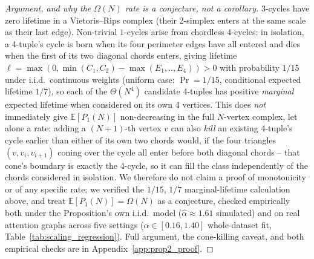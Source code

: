 \documentclass{article}
\begin{document}
\begin{proof}[Argument, and why the $\Omega(N)$ rate is a conjecture, not a corollary]
3-cycles have zero lifetime in a Vietoris--Rips complex (their 2-simplex enters at the same scale as their last edge). Non-trivial $1$-cycles arise from chordless $4$-cycles: in isolation, a 4-tuple's cycle is born when its four perimeter edges have all entered and dies when the first of its two diagonal chords enters, giving lifetime $\ell = \max(0, \min(C_1,C_2) - \max(E_1,..,E_4)) > 0$ with probability $1/15$ under i.i.d.\ continuous weights (uniform case: $\Pr = 1/15$, conditional expected lifetime $1/7$), so each of the $\Theta(N^4)$ candidate 4-tuples has positive \emph{marginal} expected lifetime when considered on its own 4 vertices. This does \emph{not} immediately give $\mathbb{E}[P_1(N)]$ non-decreasing in the full $N$-vertex complex, let alone a rate: adding a $(N{+}1)$-th vertex $v$ can also \emph{kill} an existing 4-tuple's cycle earlier than either of its own two chords would, if the four triangles $(v,v_i,v_{i+1})$ coning over the cycle all enter before both diagonal chords -- that cone's boundary is exactly the 4-cycle, so it can fill the class independently of the chords considered in isolation. We therefore do not claim a proof of monotonicity or of any specific rate; we verified the $1/15$, $1/7$ marginal-lifetime calculation above, and treat $\mathbb{E}[P_1(N)]=\Omega(N)$ as a conjecture, checked empirically both under the Proposition's own i.i.d.\ model ($\hat\alpha\approx1.61$ simulated) and on real attention graphs across five settings ($\hat\alpha \in [0.16,1.40]$ whole-dataset fit, Table~\ref{tab:scaling_regression}). Full argument, the cone-killing caveat, and both empirical checks are in Appendix~\ref{app:prop2_proof}.
\end{proof}
\end{document}
